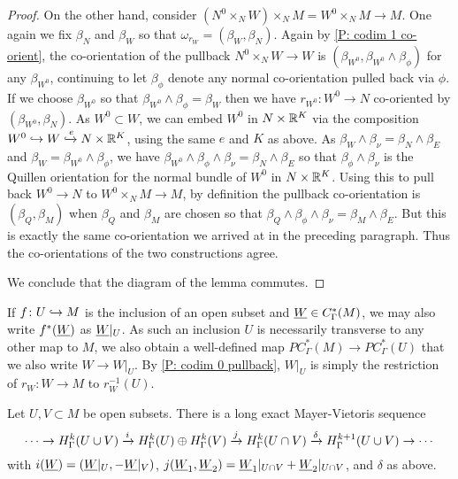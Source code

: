 \begin{proof}
	On the other hand, consider $(N^0 \times_N W) \times_N M = W^0 \times_N M \to M$.
	One again we fix $\beta_N$ and $\beta_W$ so that $\omega_{r_W} = (\beta_W,\beta_N)$.
	Again by \cref{P: codim 1 co-orient}, the co-orientation of the pullback $N^0 \times_N W \to W$ is $(\beta_{W^0},\beta_{W^0} \wedge \beta_\phi)$ for any $\beta_{W^0}$, continuing to let $\beta_\phi$ denote any normal co-orientation pulled back via $\phi$.
	If we choose $\beta_{W^0}$ so that $\beta_{W^0} \wedge \beta_\phi = \beta_W$ then we have $r_{W^0} \colon W^0 \to N$ co-oriented by $(\beta_{W^0},\beta_N)$.
	As $W^0 \subset W$, we can embed $W^0$ in $N \times \mathbb{R}^K$ via the composition $W^0 \hookrightarrow W \xhookrightarrow{e}N \times \mathbb{R}^K$, using the same $e$ and $K$ as above.
	As $\beta_W \wedge \beta_\nu = \beta_N \wedge \beta_E$ and $\beta_W = \beta_{W^0} \wedge \beta_\phi$, we have $\beta_{W^0} \wedge \beta_\phi \wedge \beta_\nu = \beta_N \wedge \beta_E$ so that $\beta_\phi \wedge \beta_\nu$ is the Quillen orientation for the normal bundle of $W^0$ in $N \times \mathbb{R}^K$.
	Using this to pull back $W^0 \to N$ to $W^0 \times_N M \to M$, by definition the pullback co-orientation is $(\beta_Q,\beta_M)$ when $\beta_Q$ and $\beta_M$ are chosen so that $\beta_Q \wedge \beta_\phi \wedge \beta_\nu = \beta_M \wedge \beta_E$.
	But this is exactly the same co-orientation we arrived at in the preceding paragraph.
	Thus the co-orientations of the two constructions agree.

	We conclude that the diagram of the lemma commutes.
\end{proof}

\begin{notation}
	If $f \colon U \hookrightarrow M$ is the inclusion of an open subset and $\underline{W} \in C^*_\Gamma(M)$, we may also write $f^*(\underline{W})$ as $\underline{W}|_U$.
	As such an inclusion $U$ is necessarily transverse to any other map to $M$, we also obtain a well-defined map $PC^*_\Gamma(M) \to PC^*_\Gamma(U)$ that we also write $W \to W|_U$.
	By \cref{P: codim 0 pullback}, $W|_U$ is simply the restriction of $r_W \colon W \to M$ to $r_W^{-1}(U)$.
\end{notation}

\begin{theorem}\label{T: absolute MV}
	Let $U,V \subset M$ be open subsets.
	There is a long exact Mayer-Vietoris sequence
	$$\cdots \to H^k_\Gamma(U \cup V) \xrightarrow{i} H^k_\Gamma(U) \oplus H^k_\Gamma(V) \xrightarrow{j} H^k_\Gamma(U \cap V) \xrightarrow{\delta} H^{k+1}_\Gamma(U \cup V)\to\cdots$$
	with $i(\underline{W}) = (\underline{W}|_U, -\underline{W}|_V)$, $j(\underline{W}_1,\underline{W}_2) = \underline{W}_1|_{U \cap V}+\underline{W}_2|_{U \cap V}$, and $\delta$ as above.
\end{theorem}

